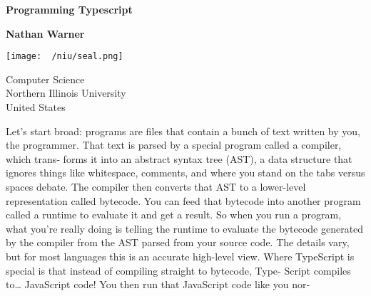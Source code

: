 \documentclass{report}
\title{\Huge{}}
\author{\huge{Nathan Warner}}
\date{\huge{}}
\begin{document}
        \begin{titlepage}
       \begin{center}
           \vspace*{1cm}
    
           \textbf{Programming Typescript}
    
           \vspace{0.5cm}
            
                
           \vspace{1.5cm}
    
           \textbf{Nathan Warner}
    
           \vfill
                
                
           \vspace{0.8cm}
         
           \texttt{[image: ~/niu/seal.png]}
                
           Computer Science \\
           Northern Illinois University\\
           United States\\
           
                
       \end{center}
    \end{titlepage}
    \tableofcontents
    \pagebreak 
    \bigbreak \noindent 
    Let’s start broad: programs are files that contain a bunch of text written by you, the
programmer. That text is parsed by a special program called a compiler, which trans‐
forms it into an abstract syntax tree (AST), a data structure that ignores things like
whitespace, comments, and where you stand on the tabs versus spaces debate. The
compiler then converts that AST to a lower-level representation called bytecode. You
can feed that bytecode into another program called a runtime to evaluate it and get a
result. So when you run a program, what you’re really doing is telling the runtime to
evaluate the bytecode generated by the compiler from the AST parsed from your
source code. The details vary, but for most languages this is an accurate high-level
view.
\bigbreak \noindent 
Where TypeScript is special is that instead of compiling straight to bytecode, Type‐
Script compiles to… JavaScript code! You then run that JavaScript code like you nor‐
\end{document}
